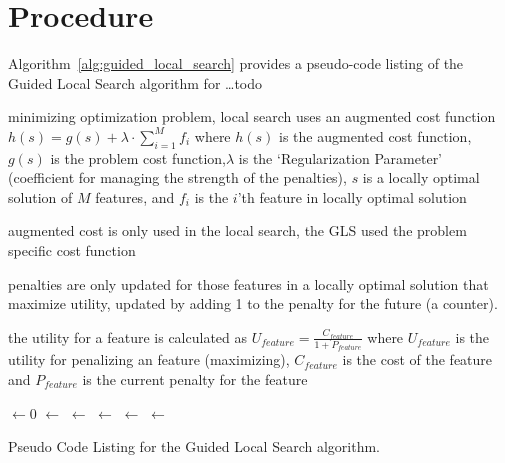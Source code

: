 \documentclass[a4paper, 11pt]{article}
\begin{document}
\section{Procedure}
\label{sec:procedure}
Algorithm~\ref{alg:guided_local_search} provides a pseudo-code listing of the Guided Local Search algorithm for \ldots todo

minimizing optimization problem, local search uses an augmented cost function $h(s)=g(s)+\lambda\cdot\sum_{i=1}^{M}f_i$ where 
$h(s)$ is the augmented cost function, $g(s)$ is the problem cost function,$\lambda$ is the `Regularization Parameter' (coefficient for managing the strength of the penalties), $s$ is a locally optimal solution of $M$ features, and $f_i$ is the $i$'th feature in locally optimal solution

augmented cost is only used in the local search, the GLS used the problem specific cost function

penalties are only updated for those features in a locally optimal solution that maximize utility, updated by adding 1 to the penalty for the future (a counter). 

the utility for a feature is calculated as $U_{feature}=\frac{C_{feature}}{1+P_{feature}}$ where $U_{feature}$ is the utility for penalizing an feature (maximizing), $C_{feature}$ is the cost of the feature and $P_{feature}$ is the current penalty for the feature

\begin{algorithm}[htp]
	\SetLine
	\KwIn{\NumIterations, \RegularizationParameter}
	\KwOut{\Best}
	\FeaturePenalties $\leftarrow 0$\;
	\Best $\leftarrow$ \RandomSolution{}\;
	\ForEach{\CurrentIteration $\in$ \NumIterations} {
		\Candidate $\leftarrow$ \LocalSearch{\Best, \RegularizationParameter, \FeaturePenalties}\;	
		\FeatureUtilities $\leftarrow$ \CalculateFeatureUtilities{\Candidate, \FeaturePenalties}\;
		\FeaturePenalties $\leftarrow$ \UpdateFeaturePenalties{\Candidate, \FeaturePenalties, \FeatureUtilities}\;
		\If{\Cost{\Candidate} $\leq$ \Cost{\Best}} {
			\Best $\leftarrow$ \Candidate\;
		}
	}
	\Return{\Best}\;
	\caption{Pseudo Code Listing for the Guided Local Search algorithm.}
	\label{alg:guided_local_search}
\end{algorithm}
\end{document}
